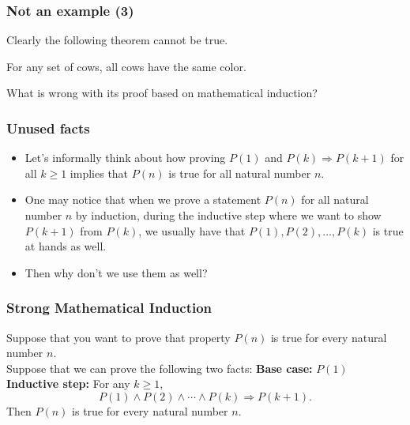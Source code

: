 \begin{frame}\frametitle{Not an example (3)}
  Clearly the following theorem cannot be true.

  \begin{tcolorbox}
    \begin{theorem}
      For any set of cows, all cows have the same color.
    \end{theorem}
  \end{tcolorbox}

  What is wrong with its proof based on mathematical induction?
  
\end{frame}

\begin{frame}\frametitle{Unused facts}
  \begin{itemize}
  \item Let's informally think about how proving $P(1)$ and
    $P(k)\Rightarrow P(k+1)$ for all $k\geq 1$ implies that $P(n)$ is
    true for all natural number $n$.
    \vspace{1.5in}
    \pause
  \item
    One may notice that when we prove a statement $P(n)$ for all
    natural number $n$ by induction, during the inductive step where
    we want to show $P(k+1)$ from $P(k)$, we usually have that
    $P(1),P(2),\ldots,P(k)$ is true at hands as well.
    \pause
  \item Then why don't we use them as well?
  \end{itemize}
\end{frame}

\begin{frame}\frametitle{Strong Mathematical Induction}
  \begin{tcolorbox}[title=Strong Induction]
    Suppose that you want to prove that property $P(n)$ is true for
    every natural number $n$.\\
    
    Suppose that we can prove the following two facts:
    \pause
    {\bf Base case:} $P(1)$ \\
    \pause
    {\bf Inductive step:} For any $k\geq 1$,
    \[P(1)\wedge P(2)\wedge\cdots\wedge P(k)\Rightarrow P(k+1).\]
    \pause
    Then $P(n)$ is true for every natural number $n$.
  \end{tcolorbox}
\end{frame}

